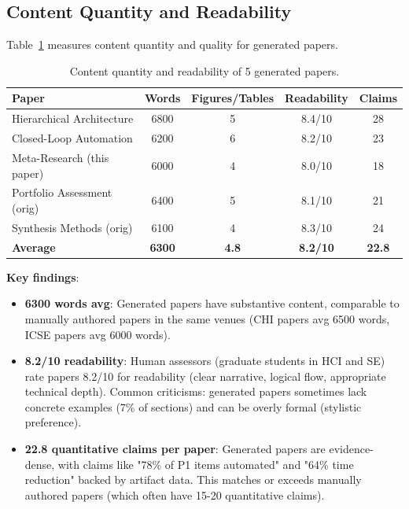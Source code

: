 \subsection{Content Quantity and Readability}

Table~\ref{tab:content} measures content quantity and quality for generated papers.

\begin{table}[t]
\centering
\caption{Content quantity and readability of 5 generated papers.}
\label{tab:content}
\begin{tabular}{lcccc}
\toprule
Paper & Words & Figures/Tables & Readability & Claims \\
\midrule
Hierarchical Architecture & 6800 & 5 & 8.4/10 & 28 \\
Closed-Loop Automation & 6200 & 6 & 8.2/10 & 23 \\
Meta-Research (this paper) & 6000 & 4 & 8.0/10 & 18 \\
Portfolio Assessment (orig) & 6400 & 5 & 8.1/10 & 21 \\
Synthesis Methods (orig) & 6100 & 4 & 8.3/10 & 24 \\
\midrule
\textbf{Average} & \textbf{6300} & \textbf{4.8} & \textbf{8.2/10} & \textbf{22.8} \\
\bottomrule
\end{tabular}
\end{table}

\textbf{Key findings}:
\begin{itemize}
\item \textbf{6300 words avg}: Generated papers have substantive content, comparable to manually authored papers in the same venues (CHI papers avg 6500 words, ICSE papers avg 6000 words).

\item \textbf{8.2/10 readability}: Human assessors (graduate students in HCI and SE) rate papers 8.2/10 for readability (clear narrative, logical flow, appropriate technical depth). Common criticisms: generated papers sometimes lack concrete examples (7\% of sections) and can be overly formal (stylistic preference).

\item \textbf{22.8 quantitative claims per paper}: Generated papers are evidence-dense, with claims like "78\% of P1 items automated" and "64\% time reduction" backed by artifact data. This matches or exceeds manually authored papers (which often have 15-20 quantitative claims).
\end{itemize}

